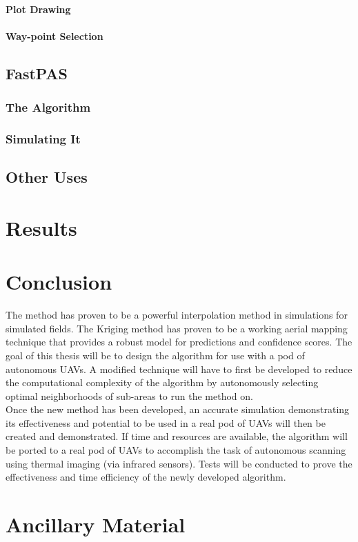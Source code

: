 \documentclass[11pt]{ucthesis}
\begin{document}
\subsubsection{Plot Drawing}
\subsubsection{Way-point Selection}

\section{FastPAS}
\subsection{The Algorithm}
\subsection{Simulating It}

\section{Other Uses}

\chapter{Results}

\chapter{Conclusion}
The method has proven to be a powerful interpolation method in simulations for simulated fields. The Kriging method has proven to be a working aerial mapping technique that provides a robust model for predictions and confidence scores. The goal of this thesis will be to design the algorithm for use with a pod of autonomous UAVs. A modified technique will have to first be developed to reduce the computational complexity of the algorithm by autonomously selecting optimal neighborhoods of sub-areas to run the method on.\\
Once the new method has been developed, an accurate simulation demonstrating its effectiveness and potential to be used in a real pod of UAVs will then be created and demonstrated. 
If time and resources are available, the algorithm will be ported to a real pod of UAVs to accomplish the task of autonomous scanning using thermal imaging (via infrared sensors). Tests will be conducted to prove the effectiveness and time efficiency of the newly developed algorithm.

\nocite{*}



\appendix
\chapter{Ancillary Material}
\end{document}
